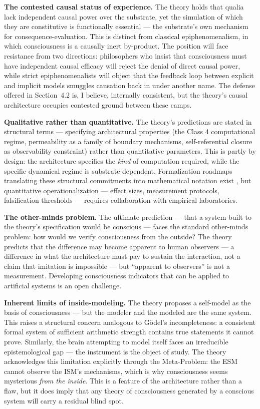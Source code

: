 \documentclass[12pt]{article}
\begin{document}
\textbf{The contested causal status of experience.} The theory holds that qualia lack independent causal power over the substrate, yet the simulation of which they are constitutive is functionally essential --- the substrate's own mechanism for consequence-evaluation. This is distinct from classical epiphenomenalism, in which consciousness is a causally inert by-product. The position will face resistance from two directions: philosophers who insist that consciousness must have independent causal efficacy will reject the denial of direct causal power, while strict epiphenomenalists will object that the feedback loop between explicit and implicit models smuggles causation back in under another name. The defense offered in Section~4.2 is, I believe, internally consistent, but the theory's causal architecture occupies contested ground between these camps.

\textbf{Qualitative rather than quantitative.} The theory's predictions are stated in structural terms --- specifying architectural properties (the Class 4 computational regime, permeability as a family of boundary mechanisms, self-referential closure as observability constraint) rather than quantitative parameters. This is partly by design: the architecture specifies the \textit{kind} of computation required, while the specific dynamical regime is substrate-dependent. Formalization roadmaps translating these structural commitments into mathematical notation exist \citep{Gruber2026b}, but quantitative operationalization --- effect sizes, measurement protocols, falsification thresholds --- requires collaboration with empirical laboratories.

\textbf{The other-minds problem.} The ultimate prediction --- that a system built to the theory's specification would be conscious --- faces the standard other-minds problem: how would we verify consciousness from the outside? The theory predicts that the difference may become apparent to human observers --- a difference in what the architecture must pay to sustain the interaction, not a claim that imitation is impossible --- but ``apparent to observers'' is not a measurement. Developing consciousness indicators that can be applied to artificial systems is an open challenge.

\textbf{Inherent limits of inside-modeling.} The theory proposes a self-model as the basis of consciousness --- but the modeler and the modeled are the same system. This raises a structural concern analogous to G{\"o}del's incompleteness: a consistent formal system of sufficient arithmetic strength contains true statements it cannot prove. Similarly, the brain attempting to model itself faces an irreducible epistemological gap --- the instrument is the object of study. The theory acknowledges this limitation explicitly through the Meta-Problem: the ESM cannot observe the ISM's mechanisms, which is why consciousness seems mysterious \emph{from the inside}. This is a feature of the architecture rather than a flaw, but it does imply that any theory of consciousness generated by a conscious system will carry a residual blind spot.
\end{document}
